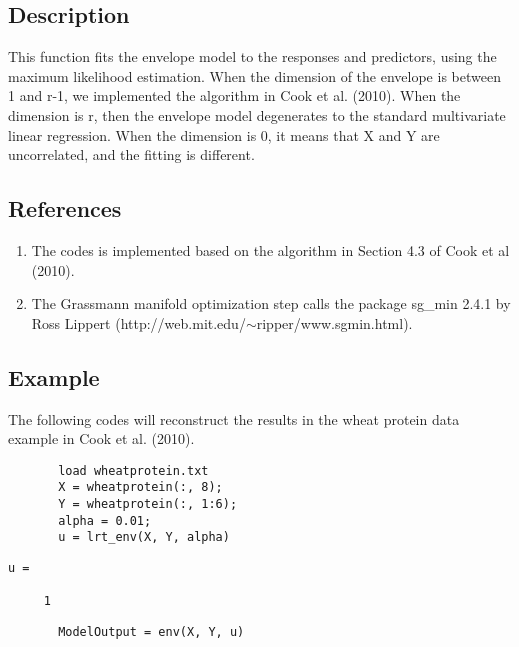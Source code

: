 \documentclass[a4paper,11pt,openany]{memoir}
\begin{document}
\subsection*{Description}

\begin{par}
This function fits the envelope model to the responses and predictors, using the maximum likelihood estimation.  When the dimension of the envelope is between 1 and r-1, we implemented the algorithm in Cook et al. (2010).  When the dimension is r, then the envelope model degenerates to the standard multivariate linear regression.  When the dimension is 0, it means that X and Y are uncorrelated, and the fitting is different.
\end{par} \vspace{1em}


\subsection*{References}

\begin{enumerate}
\setlength{\itemsep}{-1ex}
   \item The codes is implemented based on the algorithm in Section 4.3 of Cook et al (2010).
   \item The Grassmann manifold optimization step calls the package sg\_min 2.4.1 by Ross Lippert (http://web.mit.edu/$\sim$ripper/www.sgmin.html).
\end{enumerate}


\subsection*{Example}

\begin{par}
The following codes will reconstruct the results in the wheat protein data example in Cook et al. (2010).
\end{par} \vspace{1em}

\begin{verbatim}       load wheatprotein.txt
       X = wheatprotein(:, 8);
       Y = wheatprotein(:, 1:6);
       alpha = 0.01;
       u = lrt_env(X, Y, alpha)
\end{verbatim}    
        \color{lightgray}\ttfamily \begin{verbatim}
u =

     1
\end{verbatim} \rmfamily
\color{black}
       \begin{verbatim}
       ModelOutput = env(X, Y, u)
\end{verbatim}    
\end{document}
